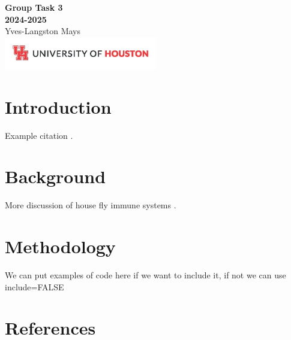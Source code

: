 \documentclass{report}
\begin{document}
\begin{titlepage}
    \centering
    \vspace*{5cm}
    {\Huge \textbf{Group Task 3\\[0.5em] 2024-2025}} \\[1.5em]
    {\Large Yves-Langston Mays} \\[2.5em]
    \vfill
    \includegraphics[width=0.5\textwidth]{UHLogo_Long.png}
    \vspace{0.8cm}
\end{titlepage}
\begingroup
\let\clearpage\relax
\tableofcontents
\endgroup
\relax
\relax
\section{Introduction}\label{introduction}

Example citation \autocite{asgari2022}.

\section{Background}\label{background}

More discussion of house fly immune systems \autocite{asgari2022}.

\section{Methodology}\label{methodology}

We can put examples of code here if we want to include it, if not we can
use include=FALSE

\section*{References}\label{references}

\printbibliography[heading=none]

\end{document}
